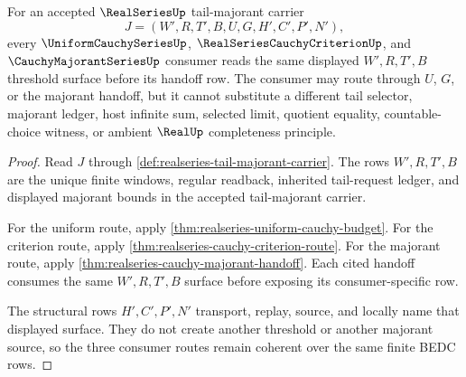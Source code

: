 \begin{theorem}
\label{thm:realseries-shared-majorant-threshold-coherence}
For an accepted $\RealSeriesUp$ tail-majorant carrier
$$
J=(W',R,T',B,U,G,H',C',P',N'),
$$
every $\UniformCauchySeriesUp$, $\RealSeriesCauchyCriterionUp$, and $\CauchyMajorantSeriesUp$ consumer reads the same displayed $W',R,T',B$ threshold surface before its handoff row. The consumer may route through $U$, $G$, or the majorant handoff, but it cannot substitute a different tail selector, majorant ledger, host infinite sum, selected limit, quotient equality, countable-choice witness, or ambient $\RealUp$ completeness principle.
\end{theorem}
\begin{proof}
Read $J$ through \autoref{def:realseries-tail-majorant-carrier}. The rows $W',R,T',B$ are the unique finite windows, regular readback, inherited tail-request ledger, and displayed majorant bounds in the accepted tail-majorant carrier.

For the uniform route, apply \autoref{thm:realseries-uniform-cauchy-budget}. For the criterion route, apply \autoref{thm:realseries-cauchy-criterion-route}. For the majorant route, apply \autoref{thm:realseries-cauchy-majorant-handoff}. Each cited handoff consumes the same $W',R,T',B$ surface before exposing its consumer-specific row.

The structural rows $H',C',P',N'$ transport, replay, source, and locally name that displayed surface. They do not create another threshold or another majorant source, so the three consumer routes remain coherent over the same finite BEDC rows.
\end{proof}

